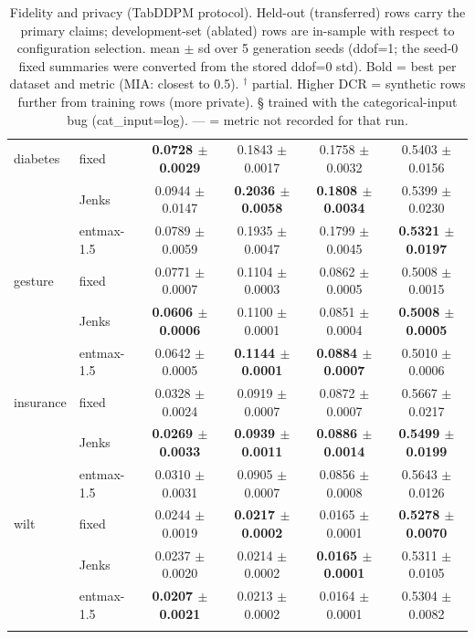 \begin{table}[t]
\begin{tabular}{llcccc}
\addlinespace
diabetes & fixed & \textbf{0.0728 $\pm$ 0.0029} & 0.1843 $\pm$ 0.0017 & 0.1758 $\pm$ 0.0032 & 0.5403 $\pm$ 0.0156 \\
 & Jenks & 0.0944 $\pm$ 0.0147 & \textbf{0.2036 $\pm$ 0.0058} & \textbf{0.1808 $\pm$ 0.0034} & 0.5399 $\pm$ 0.0230 \\
 & entmax-1.5 & 0.0789 $\pm$ 0.0059 & 0.1935 $\pm$ 0.0047 & 0.1799 $\pm$ 0.0045 & \textbf{0.5321 $\pm$ 0.0197} \\
\addlinespace
gesture & fixed & 0.0771 $\pm$ 0.0007 & 0.1104 $\pm$ 0.0003 & 0.0862 $\pm$ 0.0005 & 0.5008 $\pm$ 0.0015 \\
 & Jenks & \textbf{0.0606 $\pm$ 0.0006} & 0.1100 $\pm$ 0.0001 & 0.0851 $\pm$ 0.0004 & \textbf{0.5008 $\pm$ 0.0005} \\
 & entmax-1.5 & 0.0642 $\pm$ 0.0005 & \textbf{0.1144 $\pm$ 0.0001} & \textbf{0.0884 $\pm$ 0.0007} & 0.5010 $\pm$ 0.0006 \\
\addlinespace
insurance & fixed & 0.0328 $\pm$ 0.0024 & 0.0919 $\pm$ 0.0007 & 0.0872 $\pm$ 0.0007 & 0.5667 $\pm$ 0.0217 \\
 & Jenks & \textbf{0.0269 $\pm$ 0.0033} & \textbf{0.0939 $\pm$ 0.0011} & \textbf{0.0886 $\pm$ 0.0014} & \textbf{0.5499 $\pm$ 0.0199} \\
 & entmax-1.5 & 0.0310 $\pm$ 0.0031 & 0.0905 $\pm$ 0.0007 & 0.0856 $\pm$ 0.0008 & 0.5643 $\pm$ 0.0126 \\
\addlinespace
wilt & fixed & 0.0244 $\pm$ 0.0019 & \textbf{0.0217 $\pm$ 0.0002} & 0.0165 $\pm$ 0.0001 & \textbf{0.5278 $\pm$ 0.0070} \\
 & Jenks & 0.0237 $\pm$ 0.0020 & 0.0214 $\pm$ 0.0002 & \textbf{0.0165 $\pm$ 0.0001} & 0.5311 $\pm$ 0.0105 \\
 & entmax-1.5 & \textbf{0.0207 $\pm$ 0.0021} & 0.0213 $\pm$ 0.0002 & 0.0164 $\pm$ 0.0001 & 0.5304 $\pm$ 0.0082 \\
\addlinespace
\bottomrule
\end{tabular}
\caption{Fidelity and privacy (TabDDPM protocol). Held-out (transferred) rows carry the primary claims; development-set (ablated) rows are in-sample with respect to configuration selection. mean $\pm$ sd over 5 generation seeds (ddof=1; the seed-0 fixed summaries were converted from the stored ddof=0 std). Bold = best per dataset and metric (MIA: closest to 0.5). $^\dagger$ partial. Higher DCR = synthetic rows further from training rows (more private). § trained with the categorical-input bug (cat_input=log). — = metric not recorded for that run.}
\end{table}
